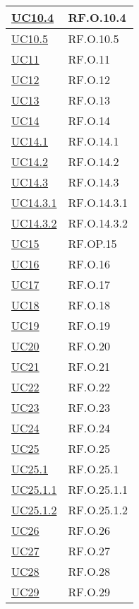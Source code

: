 \begin{longtable}{|P{4,5cm}|>{\arraybackslash}P{9cm}|}
  \hline
  \hyperref[UC10point4]{UC10.4} & RF.O.10.4\\
  \hline
  \hyperref[UC10point5]{UC10.5} & RF.O.10.5\\
  \hline
  \hyperref[UC11]{UC11} & RF.O.11 \\
  \hline
  \hyperref[UC12]{UC12} & RF.O.12 \\
  \hline
  \hyperref[UC13]{UC13} & RF.O.13 \\
  \hline
  \hyperref[UC14]{UC14} & RF.O.14 \\
  \hline
  \hyperref[UC14point1]{UC14.1} & RF.O.14.1 \\
  \hline
  \hyperref[UC14point2]{UC14.2} & RF.O.14.2 \\
  \hline
  \hyperref[UC14point3]{UC14.3} & RF.O.14.3 \\
  \hline
  \hyperref[UC14point3point1]{UC14.3.1} & RF.O.14.3.1 \\
  \hline
  \hyperref[UC14point3point2]{UC14.3.2} & RF.O.14.3.2 \\
  \hline
  \hyperref[UC15]{UC15} & RF.OP.15 \\
  \hline
  \hyperref[UC16]{UC16} & RF.O.16 \\
  \hline
  \hyperref[UC17]{UC17} & RF.O.17 \\
  \hline
  \hyperref[UC18]{UC18} & RF.O.18 \\
  \hline
  \hyperref[UC19]{UC19} & RF.O.19 \\
  \hline
  \hyperref[UC20]{UC20} & RF.O.20 \\
  \hline
  \hyperref[UC21]{UC21} & RF.O.21 \\
  \hline
  \hyperref[UC22]{UC22} & RF.O.22 \\
  \hline
  \hyperref[UC23]{UC23} & RF.O.23 \\
  \hline
  \hyperref[UC24]{UC24} & RF.O.24 \\
  \hline
  \hyperref[UC25]{UC25} & RF.O.25 \\
  \hline
  \hyperref[UC25point1]{UC25.1} & RF.O.25.1 \\
  \hline
  \hyperref[UC25point1point1]{UC25.1.1} & RF.O.25.1.1 \\
  \hline
  \hyperref[UC25poin1point2]{UC25.1.2} & RF.O.25.1.2 \\
  \hline
  \hyperref[UC26]{UC26} & RF.O.26 \\
  \hline
  \hyperref[UC27]{UC27} & RF.O.27 \\
  \hline
  \hyperref[UC28]{UC28} & RF.O.28 \\
  \hline
  \hyperref[UC29]{UC29} & RF.O.29 \\

\end{longtable}
